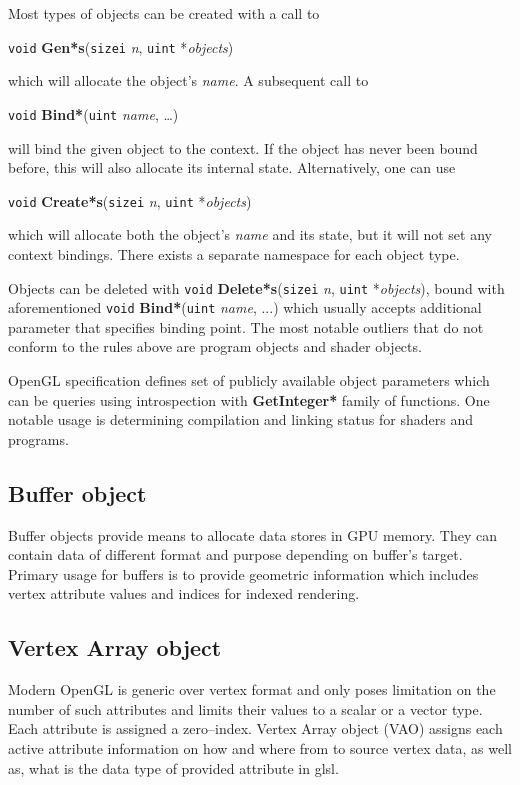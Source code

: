 \noindent Most types of objects can be created with a call to
\begin{center}
    \texttt{void} \textbf{Gen*s}(\texttt{sizei} \textit{n}, \texttt{uint} *\textit{objects})
\end{center}
\noindent which will allocate the object's \textit{name}. A subsequent call to
\begin{center}
    \texttt{void} \textbf{Bind*}(\texttt{uint} \textit{name}, \ldots)
\end{center}
\noindent will bind the given object to the context. If the object has never been bound before, this will also allocate its internal state. Alternatively, one can use
\begin{center}
    \texttt{void} \textbf{Create*s}(\texttt{sizei} \textit{n}, \texttt{uint} *\textit{objects})
\end{center}
\noindent which will allocate both the object's \textit{name} and its state, but it will not set any context bindings. There exists a separate namespace for each object type.

Objects can be deleted with \texttt{void} \textbf{Delete*s}(\texttt{sizei} \textit{n}, \texttt{uint} *\textit{objects}), bound with aforementioned \texttt{void} \textbf{Bind*}(\texttt{uint} \textit{name}, ...) which usually accepts additional parameter that specifies binding point.
The most notable outliers that do not conform to the rules above are program objects and shader objects.

OpenGL specification defines set of publicly available object parameters which can be queries using introspection with \textbf{GetInteger*} family of functions. One notable usage is determining compilation and linking status for shaders and programs. 
\subsection{Buffer object}

Buffer objects provide means to allocate data stores in GPU memory. They can contain data of different format and purpose depending on buffer's target. Primary usage for buffers is to provide geometric information which includes vertex attribute values and indices for indexed rendering.

\subsection{Vertex Array object}

Modern OpenGL is generic over vertex format and only poses limitation on the number of such attributes and limits their values to a scalar or a vector type.
Each attribute is assigned a zero--index. Vertex Array object (VAO) assigns each active 
attribute information on how and where from to source vertex data, as well as, what is the
data type of provided attribute in glsl.

